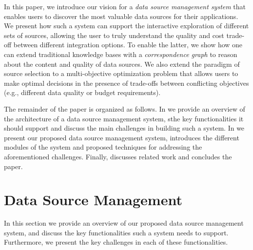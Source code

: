 \documentclass{sig-alternate}
\begin{document}
In this paper, we introduce our vision for a {\em data source management system} that enables users to discover the most valuable data sources for their applications. We present how such a system can support the interactive exploration of different sets of sources, allowing the user to truly understand the quality and cost trade-off between different integration options. To enable the latter, we show how one can extend traditional knowledge bases with a {\em correspondence graph} to reason about the content and quality of data sources. We also extend the paradigm of source selection to a multi-objective optimization problem that allows users to make optimal decisions in the presence of trade-offs between conflicting objectives (e.g., different data quality or budget requirements).

The remainder of the paper is organized as follows. In  we provide an overview of the architecture of a data source management system, sthe key functionalities it should support and discuss the main challenges in building such a system. In  we present our proposed data source management system, introduces the different modules of the system and proposed  techniques for addressing the aforementioned challenges. Finally,  discusses related work and  concludes the paper. 

\section{Data Source Management}
\label{sec:overview}
In this section we provide an overview of our proposed data source management system, and discuss the key functionalities such a system needs to support. Furthermore, we present the key challenges in each of these functionalities.
\end{document}
